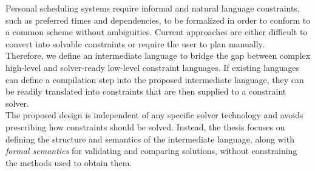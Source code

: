 
\cleardoubleoddpage%
\begin{abstract*}
    Personal scheduling systems require informal and natural language constraints, such as preferred times and dependencies, to be formalized in order to conform to a common scheme without ambiguities. Current approaches are either difficult to convert into solvable constraints or require the user to plan manually. \\
    Therefore, we define an intermediate language to bridge the gap between complex high-level and solver-ready low-level constraint languages. If existing languages can define a compilation step into the proposed intermediate language, they can be readily translated into constraints that are then supplied to a constraint solver. \\
    The proposed design is independent of any specific solver technology and avoids prescribing how constraints should be solved. Instead, the thesis focuses on defining the structure and semantics of the intermediate language, along with \emph{formal semantics} for validating and comparing solutions, without constraining the methods used to obtain them.
\end{abstract*}





